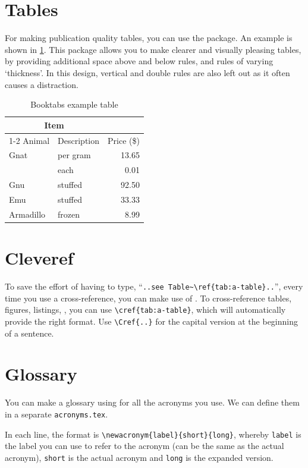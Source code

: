 \section{Tables}

For making publication quality tables, you can use the  package.
An example is shown in \cref{tab:booktabs}.
This package allows you to make clearer and visually pleasing tables, by providing additional space above and below rules, and rules of varying `thickness'.
In this design, vertical and double rules are also left out as it often causes a distraction.

\begin{table}
\centering
\begin{tabular}{@{}llr@{}} \toprule
\multicolumn{2}{c}{Item} \\ \cmidrule(r){1-2}
Animal & Description & Price (\$)\\ \midrule
Gnat & per gram & 13.65 \\
& each & 0.01 \\
Gnu & stuffed & 92.50 \\
Emu & stuffed & 33.33 \\
Armadillo & frozen & 8.99 \\ \bottomrule
\end{tabular}\caption{Booktabs example table}\label{tab:booktabs}
\end{table}

\section{Cleveref}

To save the effort of having to type, \eg{} ``\verb|..see Table~\ref{tab:a-table}..|'', every time you use a cross-reference, you can make use of .
To cross-reference tables, figures, listings, \etc{}, you can use \verb|\cref{tab:a-table}|, which will automatically provide the right format.
Use \verb|\Cref{..}| for the capital version at the beginning of a sentence.

\section{Glossary}

You can make a glossary using  for all the acronyms you use.
We can define them in a separate \verb|acronyms.tex|.

In each line, the format is \verb|\newacronym{label}{short}{long}|, whereby \verb|label| is the label you can use to refer to the acronym (can be the same as the actual acronym), \verb|short| is the actual acronym and \verb|long| is the expanded version.

